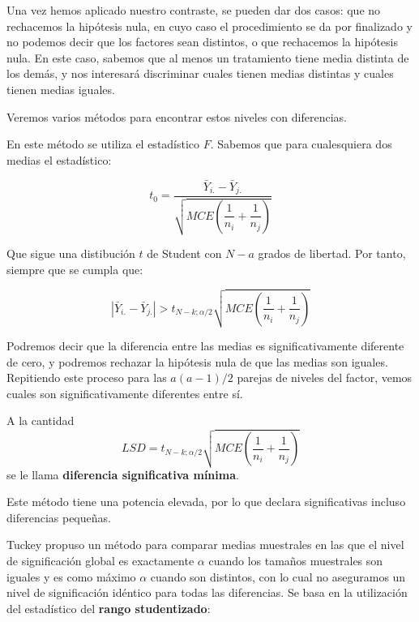 
Una vez hemos aplicado nuestro contraste, se pueden dar dos casos: que no rechacemos la hip\'otesis nula, en cuyo caso el procedimiento se da por finalizado y no podemos decir que los factores sean distintos, o que rechacemos la hip\'otesis nula. En este caso, sabemos que al menos un tratamiento tiene media distinta de los dem\'as, y nos interesar\'a discriminar cuales tienen medias distintas y cuales tienen medias iguales.

Veremos varios m\'etodos para encontrar estos niveles con diferencias.


En este m\'etodo se utiliza el estad\'istico $F$. Sabemos que para cualesquiera dos medias el estad\'istico:

\[t_0=\dfrac{\bar{Y}_{i.}-\bar{Y}_{j.}}{\sqrt{MCE\left(\dfrac{1}{n_i}+\dfrac{1}{n_j}\right)}}\]

Que sigue una distibuci\'on $t$ de Student con $N-a$ grados de libertad. Por tanto, siempre que se cumpla que:

\[|\bar{Y}_{i.}-\bar{Y}_{j.}|>t_{N-k;\alpha/2}\sqrt{MCE\left(\dfrac{1}{n_i}+\dfrac{1}{n_j}\right)}\]

Podremos decir que la diferencia entre las medias es significativamente diferente de cero, y podremos rechazar la hip\'otesis nula de que las medias son iguales. Repitiendo este proceso para las $a(a-1)/2$ parejas de niveles del factor, vemos cuales son significativamente diferentes entre s\'i.

A la cantidad
\[LSD=t_{N-k;\alpha/2}\sqrt{MCE\left(\dfrac{1}{n_i}+\dfrac{1}{n_j}\right)}\]
se le llama \textbf{diferencia significativa m\'inima}.

Este m\'etodo tiene una potencia elevada, por lo que declara significativas incluso diferencias peque\~nas.



Tuckey propuso un m\'etodo para comparar medias muestrales en las que el nivel de significaci\'on global es exactamente $\alpha$ cuando los tama\~nos muestrales son iguales y es como m\'aximo $\alpha$ cuando son distintos, con lo cual no aseguramos un nivel de significaci\'on id\'entico para todas las diferencias. Se basa en la utilizaci\'on del estad\'istico del \textbf{rango studentizado}:

